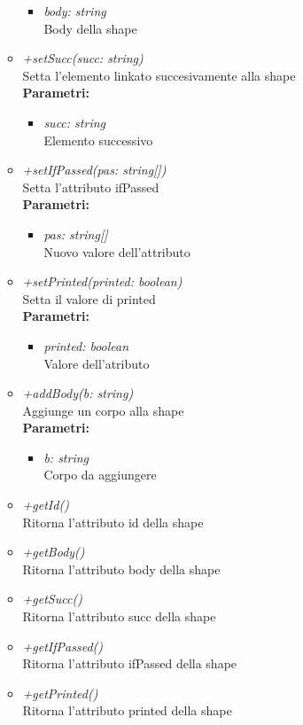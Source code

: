 \begin{itemize}
\begin{itemize}
\begin{itemize}
    			\item \emph{body: string}\\
    			Body della shape
    		\end{itemize}
    		\item \emph{+setSucc(succ: string)}\\
    		Setta l'elemento linkato succesivamente alla shape\\
    		\textbf{Parametri:}
    		\begin{itemize}
    			\item \emph{succ: string}\\
    			Elemento successivo
    		\end{itemize}
    		\item \emph{+setIfPassed(pas: string[])}\\
    		Setta l'attributo ifPassed\\
    		\textbf{Parametri:}
    		\begin{itemize}
    			\item \emph{pas: string[]}\\
    			Nuovo valore dell'attributo
    		\end{itemize}
    		\item \emph{+setPrinted(printed: boolean)}\\
    		Setta il valore di printed\\
    		\textbf{Parametri:}
    		\begin{itemize}
    			\item \emph{printed: boolean}\\
    			Valore dell'atributo
    		\end{itemize}
    		\item \emph{+addBody(b: string)}\\
    		Aggiunge un corpo alla shape\\
    		\textbf{Parametri:}
    		\begin{itemize}
    			\item \emph{b: string}\\
    			Corpo da aggiungere
    		\end{itemize}
    		\item \emph{+getId()}\\
    		Ritorna l'attributo id della shape
    		\item \emph{+getBody()}\\
    		Ritorna l'attributo body della shape
    		\item \emph{+getSucc()}\\
    		Ritorna l'attributo succ della shape
    		\item \emph{+getIfPassed()}\\
    		Ritorna l'attributo ifPassed della shape
    		\item \emph{+getPrinted()}\\
    		Ritorna l'attributo printed della shape
    	\end{itemize}
\end{itemize}